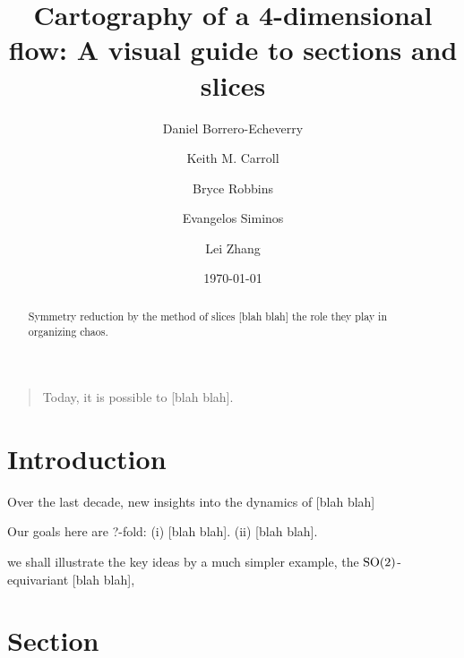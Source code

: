 \documentclass[aip,cha,reprint,
secnumarabic,
nofootinbib, tightenlines,
nobibnotes, showkeys, showpacs,
groupedaddress
]{revtex4-1}
\begin{document}
\title[Low-dimensional cartography]
{Cartography of a 4-dimensional flow: A visual guide to sections and slices}

\author{Daniel Borrero-Echeverry}
\author{Keith M. Carroll}
\author{Bryce Robbins}
\author{Evangelos Siminos}
\author{Lei Zhang}

\date{\today}

    \begin{abstract}
Symmetry reduction by the method of slices [blah blah]
the role they play in organizing chaos.
    \end{abstract}


\maketitle

    \begin{quotation}
Today, it is possible to  [blah blah].
    \end{quotation}

\section{Introduction}
\label{s:intro}

Over the last decade, new insights into the dynamics of  [blah blah]

Our goals here are ?-fold:
(i)  [blah blah].
(ii) [blah blah].

we shall illustrate the key ideas by a much
simpler example, the $\textrm{SO}(2)$-equivariant  [blah blah],

\section{Section}
\label{s:cut}
\end{document}
